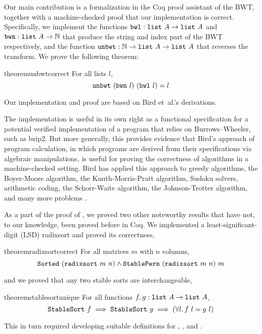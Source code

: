 \documentclass[sigplan,10pt,anonymous,review]{thesis}
\begin{document}
Our main contribution is a formalization in the Coq proof assistant of
the BWT, together with a machine-checked proof that our implementation
is correct. Specifically, we implement the functions $\texttt{\textup{bwl}} :
\texttt{\textup{list}}~A \to \texttt{\textup{list}}~A$ and $\texttt{\textup{bwn}} : \texttt{\textup{list}}~A \to
\mathbb{N}$ that produce the string and index part of the BWT
respectively, and the function $\texttt{\textup{unbwt}} : \mathbb{N} \to
\texttt{\textup{list}}~A \to \texttt{\textup{list}}~A$ that reverses the transform. We prove the
following theorem:
\begin{restatable*}{theorem}{unbwtcorrect}
  \label{thm:unbwt_correct}
  For all lists $l$,
  \begin{equation*}
    \texttt{\textup{unbwt}}~(\texttt{\textup{bwn}}~l)~(\texttt{\textup{bwl}}~l) = l
  \end{equation*}
\end{restatable*}
Our implementation and proof are based on Bird et~al.'s derivations.

The implementation is useful in its own right as a functional
specification for a potential verified implementation of a program
that relies on Burrows--Wheeler, such as bzip2\cite{appel-func-spec}.
But more generally, this provides evidence that Bird's approach of
program calculation, in which programs are derived from their
specifications via algebraic manipulations, is useful for proving the
correctness of algorithms in a machine-checked setting. Bird has
applied this approach to greedy algorithms, the Boyer-Moore algorithm,
the Knuth-Morris-Pratt algorithm, Sudoku solvers, arithmetic coding,
the Schorr-Waite algorithm, the Johnson-Trotter algorithm, and many
more problems \cite{pearls}.

As a part of the proof of , we proved two
other noteworthy results that have not, to our knowledge, been proved
before in Coq. We implemented a least-significant-digit (LSD)
radixsort and proved its correctness,
\begin{restatable*}{theorem}{radixsortcorrect}
  \label{thm:radixsort_correct}%
  For all matrices $m$ with $n$ columns,
  \begin{equation*}
    \texttt{\textup{Sorted}}~(\texttt{\textup{radixsort}}~m~n) \land \texttt{\textup{StablePerm}}~(\texttt{\textup{radixsort}}~m~n)~m
  \end{equation*}
\end{restatable*}
and we proved that any two stable sorts are interchangeable,
\begin{restatable*}{theorem}{stablesortunique}
  \label{thm:stablesort_unique}
  For all functions $f, g: \texttt{\textup{list}}~A \to \texttt{\textup{list}}~A$,
  \begin{equation*}
    \texttt{\textup{StableSort}}~f \implies \texttt{\textup{StableSort}}~g \implies
    (\forall l,f~l = g~l)
  \end{equation*}
\end{restatable*}
This in turn required developing suitable definitions for
, , and .
\end{document}
